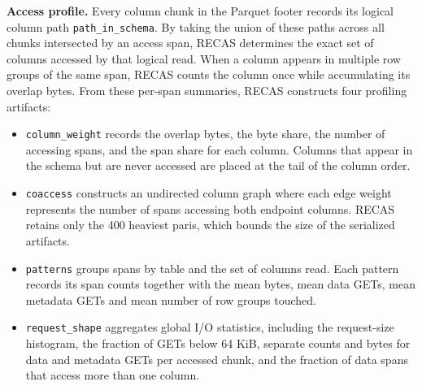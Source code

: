 \textbf{Access profile. }%
Every column chunk in the Parquet footer records its logical column path
\texttt{path\_in\_schema}. %
By taking the union of these paths across all chunks intersected by an access span, RECAS determines the exact set of columns accessed by that logical read. When a column appears in multiple row groups of the same span, RECAS counts the column once while accumulating its overlap bytes. From these per-span summaries, RECAS constructs four profiling
artifacts:
\begin{itemize}
     \item \texttt{column\_weight} records the overlap bytes, the byte share, the number of accessing spans, and the span share for each column. Columns that appear in the schema but are never accessed are placed at the tail of the column order.
    \item \texttt{coaccess} constructs an undirected column graph where each edge weight represents the number of spans accessing both endpoint columns. RECAS retains only the 400 heaviest paris, which bounds the size of the serialized artifacts.
    \item \texttt{patterns} %
    groups spans by table and the set of columns read. Each pattern records %
    its span counts together with the mean bytes, mean data GETs, mean metadata GETs and mean number of row groups touched.
    \item \texttt{request\_shape} %
    aggregates global I/O statistics, including the request-size histogram, the fraction of GETs below 64 KiB, separate counts and bytes for data and metadata GETs per accessed chunk, and the fraction of data spans that access more than one column.
\end{itemize}

